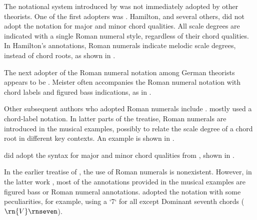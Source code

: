 

The notational system introduced by
\textcite{weber1817versuch} was not immediately adopted by
other theorists. One of the first adopters was
\textcite{hamilton1840catechism}. Hamilton, and several
others, did not adopt the notation for major and minor chord
qualities. All scale degrees are indicated with a single
Roman numeral style, regardless of their chord qualities. In
Hamilton's annotations, Roman numerals indicate melodic
scale degrees, instead of chord roots, as shown in
.


The next adopter of the Roman numeral notation among German
theorists appears to be \textcite{meister1852vollstandige}.
Meister often accompanies the Roman numeral notation with
chord labels and figured bass indications, as in
.


Other subsequent authors who adopted Roman numerals include
\parencite{sechter1853grundsatze, richter1860lehrbuch,
tiersch1874elementarbuch, tracy1878theory}.
\textcite{sechter1853grundsatze} mostly used a chord-label
notation. In latter parts of the treatise, Roman numerals
are introduced in the musical examples, possibly to relate
the scale degree of a chord root in different key contexts.
An example is shown in
.


\textcite{richter1860lehrbuch} did adopt the syntax for
major and minor chord qualities from
\textcite{weber1817versuch}, shown in
.

In the earlier treatise of \textcite{tiersch1868system}, the
use of Roman numerals is nonexistent. However, in the latter
work \textcite{tiersch1874elementarbuch}, most of the
annotations provided in the musical examples are figured
bass or Roman numeral annotations.
\textcite{tracy1878theory} adopted the notation with some
peculiarities, for example, using a `7` for all except
Dominant seventh chords ($\rn{V}\rnseven$).

